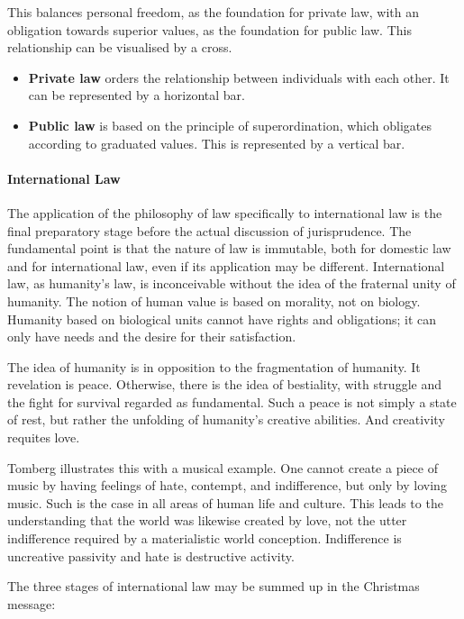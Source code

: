 This balances personal freedom, as the foundation for private law, with an obligation towards superior values, as the foundation for public law. This relationship can be visualised by a cross.

\begin{itemize}


\item \textbf{Private law} orders the relationship between individuals with each other. It can be represented by a horizontal bar.

\item \textbf{Public law} is based on the principle of superordination, which obligates according to graduated values. This is represented by a vertical bar.
\end{itemize}


\paragraph{International Law}


The application of the philosophy of law specifically to international law is the final preparatory stage before the actual discussion of jurisprudence. The fundamental point is that the nature of law is immutable, both for domestic law and for international law, even if its application may be different. International law, as humanity's law, is inconceivable without the idea of the fraternal unity of humanity. The notion of human value is based on morality, not on biology. Humanity based on biological units cannot have rights and obligations; it can only have needs and the desire for their satisfaction.

The idea of humanity is in opposition to the fragmentation of humanity. It revelation is peace. Otherwise, there is the idea of bestiality, with struggle and the fight for survival regarded as fundamental. Such a peace is not simply a state of rest, but rather the unfolding of humanity's creative abilities. And creativity requites love.

Tomberg illustrates this with a musical example. One cannot create a piece of music by having feelings of hate, contempt, and indifference, but only by loving music. Such is the case in all areas of human life and culture. This leads to the understanding that the world was likewise created by love, not the utter indifference required by a materialistic world conception. Indifference is uncreative passivity and hate is destructive activity.

The three stages of international law may be summed up in the Christmas message:

